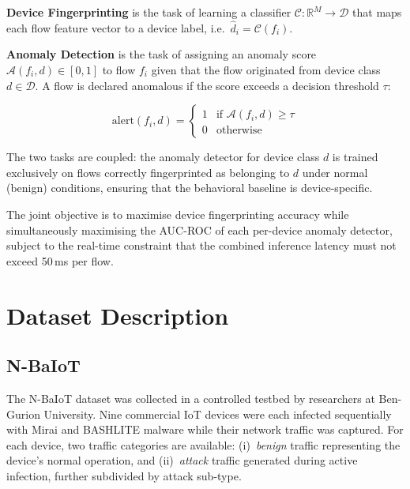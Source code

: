 \documentclass[conference]{IEEEtran}
\begin{document}
\textbf{Device Fingerprinting} is the task of learning a classifier
$\mathcal{C}: \mathbb{R}^M \rightarrow \mathcal{D}$ that maps each flow
feature vector to a device label, i.e.\
$\hat{d}_i = \mathcal{C}(f_i)$.

\textbf{Anomaly Detection} is the task of assigning an anomaly score
$\mathcal{A}(f_i, d) \in [0,1]$ to flow $f_i$ given that the flow
originated from device class $d \in \mathcal{D}$. A flow is declared
anomalous if the score exceeds a decision threshold $\tau$:

\begin{equation}
    \text{alert}(f_i, d) =
    \begin{cases}
        1 & \text{if } \mathcal{A}(f_i, d) \geq \tau \\
        0 & \text{otherwise}
    \end{cases}
    \label{eq:alert}
\end{equation}

The two tasks are coupled: the anomaly detector for device class $d$ is
trained exclusively on flows correctly fingerprinted as belonging to $d$
under normal (benign) conditions, ensuring that the behavioral baseline
is device-specific.

The joint objective is to maximise device fingerprinting accuracy while
simultaneously maximising the AUC-ROC of each per-device anomaly detector,
subject to the real-time constraint that the combined inference latency
must not exceed 50\,ms per flow.

\section{Dataset Description}
\label{sec:dataset}

\subsection{N-BaIoT}

The N-BaIoT dataset \cite{meidan2018nbaiot} was collected in a controlled
testbed by researchers at Ben-Gurion University. Nine commercial IoT devices
were each infected sequentially with Mirai and BASHLITE malware while their
network traffic was captured. For each device, two traffic categories are
available: (i)~\textit{benign} traffic representing the device's normal
operation, and (ii)~\textit{attack} traffic generated during active
infection, further subdivided by attack sub-type.
\end{document}
